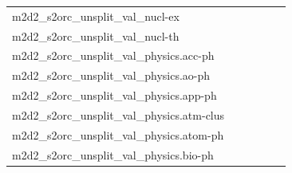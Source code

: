 \documentclass[dvipsnames]{article}
\begin{document}
\begin{appendix}
{\begin{longtable}{m{6cm}m{1.7cm}m{1.7cm}m{1.7cm}m{1.7cm}m{1.7cm}}
	m2d2\_s2orc\_unsplit\_val\_nucl-ex  & \colorbox[HTML]{edf8b2}{\makebox[\mywidth][c]{13.02}} & \colorbox[HTML]{e3f4aa}{\makebox[\mywidth][c]{12.94}} & \colorbox[HTML]{ffffe5}{\makebox[\mywidth][c]{14.61}} & \colorbox[HTML]{d1ec9f}{\makebox[\mywidth][c]{12.85}} & \colorbox[HTML]{77c578}{\makebox[\mywidth][c]{12.63}}\\
	m2d2\_s2orc\_unsplit\_val\_nucl-th  & \colorbox[HTML]{c3e698}{\makebox[\mywidth][c]{11.65}} & \colorbox[HTML]{e1f3a9}{\makebox[\mywidth][c]{11.78}} & \colorbox[HTML]{ffffe5}{\makebox[\mywidth][c]{13.43}} & \colorbox[HTML]{cae99c}{\makebox[\mywidth][c]{11.68}} & \colorbox[HTML]{77c578}{\makebox[\mywidth][c]{11.48}}\\
	m2d2\_s2orc\_unsplit\_val\_physics.acc-ph  & \colorbox[HTML]{b3df91}{\makebox[\mywidth][c]{13.75}} & \colorbox[HTML]{e5f4ab}{\makebox[\mywidth][c]{14.01}} & \colorbox[HTML]{ffffe5}{\makebox[\mywidth][c]{16.17}} & \colorbox[HTML]{b2df90}{\makebox[\mywidth][c]{13.74}} & \colorbox[HTML]{77c578}{\makebox[\mywidth][c]{13.58}}\\
	m2d2\_s2orc\_unsplit\_val\_physics.ao-ph  & \colorbox[HTML]{cdeb9d}{\makebox[\mywidth][c]{13.92}} & \colorbox[HTML]{e3f4aa}{\makebox[\mywidth][c]{14.04}} & \colorbox[HTML]{ffffe5}{\makebox[\mywidth][c]{15.91}} & \colorbox[HTML]{c3e698}{\makebox[\mywidth][c]{13.89}} & \colorbox[HTML]{77c578}{\makebox[\mywidth][c]{13.68}}\\
	m2d2\_s2orc\_unsplit\_val\_physics.app-ph  & \colorbox[HTML]{d8efa2}{\makebox[\mywidth][c]{13.70}} & \colorbox[HTML]{e8f6ae}{\makebox[\mywidth][c]{13.81}} & \colorbox[HTML]{ffffe5}{\makebox[\mywidth][c]{15.54}} & \colorbox[HTML]{c3e698}{\makebox[\mywidth][c]{13.62}} & \colorbox[HTML]{77c578}{\makebox[\mywidth][c]{13.43}}\\
	m2d2\_s2orc\_unsplit\_val\_physics.atm-clus  & \colorbox[HTML]{ceeb9e}{\makebox[\mywidth][c]{13.00}} & \colorbox[HTML]{e4f4ab}{\makebox[\mywidth][c]{13.13}} & \colorbox[HTML]{ffffe5}{\makebox[\mywidth][c]{15.11}} & \colorbox[HTML]{cdeb9d}{\makebox[\mywidth][c]{13.00}} & \colorbox[HTML]{77c578}{\makebox[\mywidth][c]{12.74}}\\
	m2d2\_s2orc\_unsplit\_val\_physics.atom-ph  & \colorbox[HTML]{d0ec9e}{\makebox[\mywidth][c]{12.74}} & \colorbox[HTML]{e3f4aa}{\makebox[\mywidth][c]{12.84}} & \colorbox[HTML]{ffffe5}{\makebox[\mywidth][c]{14.44}} & \colorbox[HTML]{d1ec9f}{\makebox[\mywidth][c]{12.75}} & \colorbox[HTML]{77c578}{\makebox[\mywidth][c]{12.53}}\\
	m2d2\_s2orc\_unsplit\_val\_physics.bio-ph  & \colorbox[HTML]{cae99c}{\makebox[\mywidth][c]{13.30}} & \colorbox[HTML]{e2f3a9}{\makebox[\mywidth][c]{13.42}} & \colorbox[HTML]{ffffe5}{\makebox[\mywidth][c]{15.26}} & \colorbox[HTML]{ceeb9e}{\makebox[\mywidth][c]{13.32}} & \colorbox[HTML]{77c578}{\makebox[\mywidth][c]{13.08}}\\

\end{longtable}}
\end{appendix}
\end{document}
